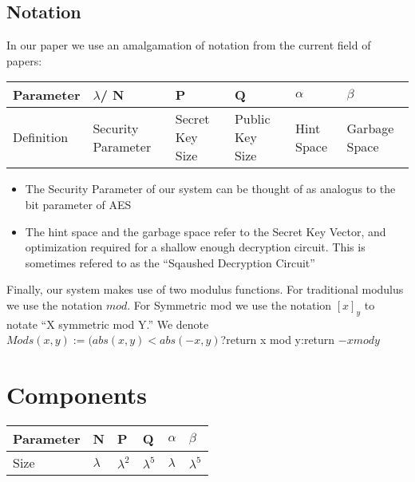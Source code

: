 \documentclass[letterpaper,11pt]{article} %
\begin{document}
\subsection{Notation}
In our paper we use an amalgamation of notation from the current field of papers:


\begin{center}
\begin{tabular}{ l | l | l | l | l | l }
\hline
Parameter & $\lambda$/ N & P & Q & $\alpha$ & $\beta$ \\ \hline
Definition & Security Parameter & Secret Key Size   & Public Key Size & Hint Space & Garbage Space  \\ \hline
\end{tabular}
\end{center}

\begin{itemize}
\item The Security Parameter of our system  can be thought of as analogus to the bit parameter of AES
\item The hint space and the garbage space refer to the Secret Key Vector, and optimization required for a shallow enough decryption circuit. This is sometimes refered to as the ``Sqaushed Decryption Circuit'' 
\end{itemize}

Finally, our system makes use of two modulus functions. For traditional modulus we use the notation $mod$. For Symmetric mod we use the notation $[x]_y$ to notate ``X symmetric mod Y.''
We denote $Mods(x,y):=(abs(x,y)<abs(-x,y)$?return x mod y:return $-x mod y$

\section*{Components}

\begin{center}
\begin{tabular}{  l | l | l | l | l | l }
\hline
Parameter & N & P & Q & $\alpha$ & $\beta$ \\ \hline
Size &  $\lambda$ & $\lambda ^2$  & $\lambda ^5$ & $\lambda$ & $\lambda ^5$  \\ \hline
\end{tabular}
\end{center}
\end{document}
